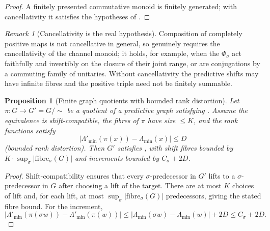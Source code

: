 \documentclass[11pt]{article}
\newtheorem{proposition}[theorem]{Proposition}
\theoremstyle{definition}
\theoremstyle{remark}
\newtheorem{remark}[theorem]{Remark}
\newcommand{\Lam}{\Lambda}
\begin{document}
\begin{proof}
A finitely presented commutative monoid is finitely generated; with
cancellativity it satisfies the hypotheses of .
\end{proof}

\begin{remark}[Cancellativity is the real hypothesis]
\label{rem:cancellativity-needed}
Composition of completely positive maps is not cancellative in general, so
 genuinely requires the cancellativity of the channel
monoid; it holds, for example, when the $\Phi_\sigma$ act faithfully and
invertibly on the closure of their joint range, or are conjugations by a
commuting family of unitaries.  Without cancellativity the predictive shifts may
have infinite fibres and the positive triple need not be finitely summable.
\end{remark}

\begin{proposition}[Finite graph quotients with bounded rank distortion]
\label{prop:fibres-quotient}
Let $\pi:G\to G'=G/{\sim}$ be a quotient of a predictive graph satisfying
.  Assume the equivalence is shift-compatible, the fibres of
$\pi$ have size $\le K$, and the rank functions satisfy
\[
  |\Lam'_{\min}(\pi(x))-\Lam_{\min}(x)|\le D
\]
\textup{(}bounded rank distortion\textup{)}.  Then $G'$ satisfies
, with shift fibres bounded by
$K\cdot\sup_\sigma|\text{fibre}_\sigma(G)|$ and increments bounded by
$C_\sigma+2D$.
\end{proposition}

\begin{proof}
Shift-compatibility ensures that every $\sigma$-predecessor in $G'$ lifts to a
$\sigma$-predecessor in $G$ after choosing a lift of the target.  There are at
most $K$ choices of lift and, for each lift, at most
$\sup_\sigma|\text{fibre}_\sigma(G)|$ predecessors, giving the stated fibre
bound.  For the increment,
\[
|\Lam'_{\min}(\pi(\sigma w))-\Lam'_{\min}(\pi(w))|
 \le |\Lam_{\min}(\sigma w)-\Lam_{\min}(w)|+2D
 \le C_\sigma+2D .
\]
\end{proof}
\end{document}
